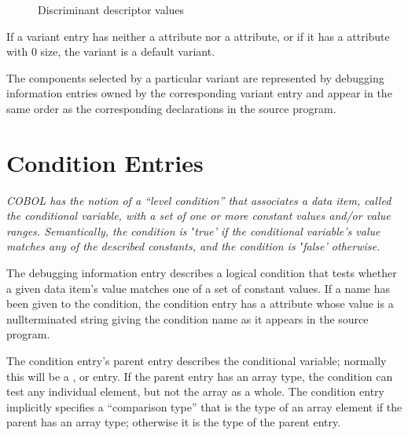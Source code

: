 \begin{figure}[here]
\caption{Discriminant descriptor values}\label{fig:discriminantdescriptorvalues}
\end{figure}

If a variant entry has neither a 
attribute nor a  attribute, or if it has
a  attribute with 0 size, the variant is a
default variant.

The components selected by a particular variant are represented
by debugging information entries owned by the corresponding
variant entry and appear in the same order as the corresponding
declarations in the source program.

\section{Condition Entries}
\label{chap:conditionentries}

\textit{COBOL has the notion of 
a ``level condition'' that
associates a data item, called the conditional variable, with
a set of one or more constant values and/or value ranges.
Semantically, the condition is ‛true’ if the conditional
variable's value matches any of the described constants,
and the condition is ‛false’ otherwise.}

The 
debugging information entry
describes a
logical condition that tests whether a given data item’s
value matches one of a set of constant values. If a name
has been given to the condition, the condition entry has a
 attribute
whose value is a null\dash terminated string
giving the condition name as it appears in the source program.

The condition entry's parent entry describes the conditional
variable; normally this will be a ,
 or 
 entry.
If 
the parent
entry has an array type, the condition can test any individual
element, but not the array as a whole. The condition entry
implicitly specifies a “comparison type” that is the
type of an array element if the parent has an array type;
otherwise it is the type of the parent entry.

